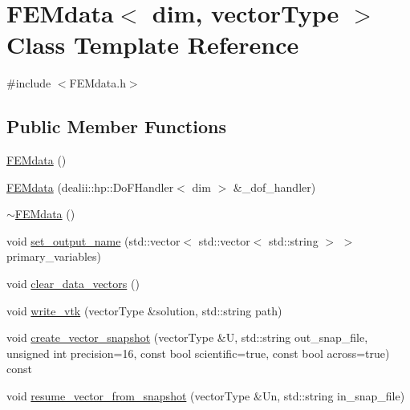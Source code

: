 \section{F\+E\+Mdata$<$ dim, vector\+Type $>$ Class Template Reference}
\label{class_f_e_mdata}


{\ttfamily \#include $<$F\+E\+Mdata.\+h$>$}

\subsection*{Public Member Functions}
\begin{DoxyCompactItemize}
\item 
\mbox{\hyperlink{class_f_e_mdata_abb8edbdb28fbec855696a4a02648ad2d}{F\+E\+Mdata}} ()
\item 
\mbox{\hyperlink{class_f_e_mdata_ada690a46b4cec06866ffa32ca2e07c07}{F\+E\+Mdata}} (dealii\+::hp\+::\+Do\+F\+Handler$<$ dim $>$ \&\+\_\+dof\+\_\+handler)
\item 
\mbox{\hyperlink{class_f_e_mdata_ab7baf283d0dd33996919e2530b735d84}{$\sim$\+F\+E\+Mdata}} ()
\item 
void \mbox{\hyperlink{class_f_e_mdata_a770f8539c16d21624bcedc1f6bee9d68}{set\+\_\+output\+\_\+name}} (std\+::vector$<$ std\+::vector$<$ std\+::string $>$ $>$ primary\+\_\+variables)
\item 
void \mbox{\hyperlink{class_f_e_mdata_ac201e22d75178ffe4d4355c53ee0b756}{clear\+\_\+data\+\_\+vectors}} ()
\item 
void \mbox{\hyperlink{class_f_e_mdata_a62d54e01135c4ab0b58f51441732dca3}{write\+\_\+vtk}} (vector\+Type \&solution, std\+::string path)
\item 
void \mbox{\hyperlink{class_f_e_mdata_aaffa90fc1adcd37311428f7e49b98263}{create\+\_\+vector\+\_\+snapshot}} (vector\+Type \&U, std\+::string out\+\_\+snap\+\_\+file, unsigned int precision=16, const bool scientific=true, const bool across=true) const
\item 
void \mbox{\hyperlink{class_f_e_mdata_a2611613e158345b619062316e281c4c9}{resume\+\_\+vector\+\_\+from\+\_\+snapshot}} (vector\+Type \&Un, std\+::string in\+\_\+snap\+\_\+file)
\end{DoxyCompactItemize}
